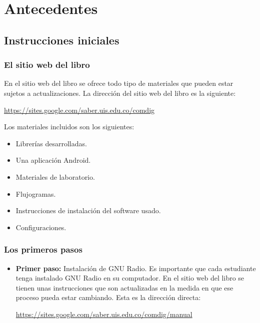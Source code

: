 \chapter{ Antecedentes}
\label{Cap:cAPITULO}
\section{Instrucciones iniciales}

\subsection{El sitio web del libro}
En el sitio web del libro se ofrece todo tipo de materiales que pueden estar sujetos a actualizaciones. La dirección del sitio web del libro es la siguiente: 
\cite{USRP} \cite{Harris2001} 

   \begin{center}
    \url{https://sites.google.com/saber.uis.edu.co/comdig} 
   \end{center}

Los materiales incluidos son los siguientes:
\begin{itemize}
    \item  Librerías desarrolladas.
    \item   Una aplicación Android.
    \item   Materiales de laboratorio.
	\item   Flujogramas.
	\item  Instrucciones de instalación del software usado.
	\item  Configuraciones.
\end{itemize}

\subsection{Los primeros pasos} %
\begin{itemize}
\item  \textbf{Primer paso:} Instalación de GNU Radio. Es importante que cada estudiante tenga instalado GNU Radio en su computador. En el sitio web del libro se tienen unas instrucciones que son actualizadas en la medida en que ese proceso pueda estar cambiando. Esta es la dirección directa:
\begin{center}
\url{https://sites.google.com/saber.uis.edu.co/comdig/manual} 
\end{center}
\end{itemize}


